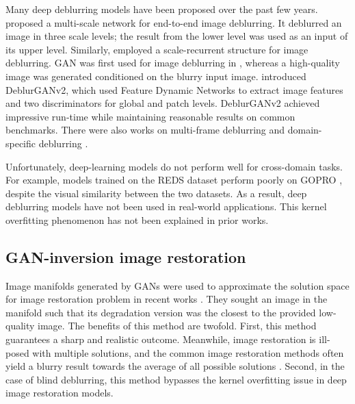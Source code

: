 \documentclass[final]{cvpr}
\newcommand{\minisection}[1]{\vspace{1mm}\noindent{\bf #1}}
\begin{document}
\minisection{Learning-based deblurring.}
Many deep deblurring models have been proposed over the past few years. \citet{nah2017deep} proposed a multi-scale network for end-to-end image deblurring. It deblurred an image in three scale levels; the result from the lower level was used as an input of its upper level. Similarly, \citet{tao2018scale} employed a scale-recurrent structure for image deblurring. GAN \cite{goodfellow2014generative} was first used for image deblurring in \cite{kupyn2018deblurgan}, whereas a high-quality image was generated conditioned on the blurry input image. \citet{kupyn2019deblurgan} introduced DeblurGANv2, which used Feature Dynamic Networks \cite{lin2017feature} to extract image features and two discriminators for global and patch levels. DeblurGANv2 achieved impressive run-time while maintaining reasonable results on common benchmarks. There were also works on multi-frame deblurring \cite{wang2019edvr,su2017deep,zhou2019spatio} and domain-specific deblurring \cite{ren2020neural,lin2020learning,Shen_2018_CVPR,song2019joint,xu2017learning,yasarla2020deblurring,hradivs2015convolutional}.

Unfortunately, deep-learning models do not perform well for cross-domain tasks. For example, models trained on the REDS dataset \cite{nah2019ntire} perform poorly on GOPRO \cite{nah2017deep}, despite the visual similarity between the two datasets. As a result,  deep deblurring models have not been used in real-world applications. This kernel overfitting phenomenon has not been explained in prior works.

\subsection{GAN-inversion image restoration}

Image manifolds generated by GANs \cite{goodfellow2014generative} were used to approximate the solution space for image restoration problem in recent works \cite{pan2020exploiting,menon2020pulse}. They sought an image in the manifold such that its degradation version was the closest to the provided low-quality image. The benefits of this method are twofold. First, this method guarantees a sharp and realistic outcome. Meanwhile, image restoration is ill-posed with multiple solutions, and the common image restoration methods often yield a blurry result towards the average of all possible solutions \cite{menon2020pulse}. Second, in the case of blind deblurring, this method bypasses the kernel overfitting issue in deep image restoration models. 
\end{document}
